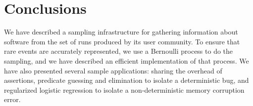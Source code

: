\section{Conclusions}
\label{sec:conclusions}

We have described a sampling infrastructure for gathering information
about software from the set of runs produced by its user community.
To ensure that rare events are accurately represented, we use a
Bernoulli process to do the sampling, and we have described an
efficient implementation of that process.  We have also presented
several sample applications: sharing the overhead of assertions,
predicate guessing and elimination to isolate a deterministic bug, and
regularized logistic regression to isolate a non-deterministic memory
corruption error.

